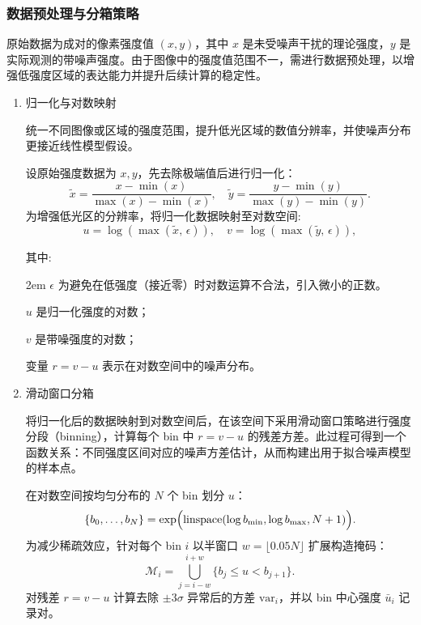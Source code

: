 \documentclass[a4paper]{article}
\begin{document}
	\subsubsection{数据预处理与分箱策略}
	原始数据为成对的像素强度值 $(x, y)$，其中 $x$ 是未受噪声干扰的理论强度，$y$ 是实际观测的带噪声强度。由于图像中的强度值范围不一，需进行数据预处理，以增强低强度区域的表达能力并提升后续计算的稳定性。
	\begin{enumerate}
    \item 归一化与对数映射\par
     \hspace{2em}统一不同图像或区域的强度范围，提升低光区域的数值分辨率，并使噪声分布更接近线性模型假设。\par
	设原始强度数据为 $x, y$，先去除极端值后进行归一化：
	$$
     \tilde x = \frac{x - \min(x)}{\max(x)-\min(x)},\quad
     \tilde y = \frac{y - \min(y)}{\max(y)-\min(y)}.
    $$
    为增强低光区的分辨率，将归一化数据映射至对数空间:
	$$
		u = \log(\max(\tilde x,\,\epsilon)),\quad
		v = \log(\max(\tilde y,\,\epsilon)),
	$$

	其中: \par
	
	\begin{adjustwidth}{2em}{} %
		$ \epsilon $ 为避免在低强度（接近零）时对数运算不合法，引入微小的正数。\par
		$ u $ 是归一化强度的对数；\par
		$ v $ 是带噪强度的对数；\par
		变量 $r = v - u$ 表示在对数空间中的噪声分布。
	\end{adjustwidth}
	\item 滑动窗口分箱\par
	\hspace{2em}将归一化后的数据映射到对数空间后，在该空间下采用滑动窗口策略进行强度分段（binning），计算每个 bin 中 $r = v - u$ 的残差方差。此过程可得到一个函数关系：不同强度区间对应的噪声方差估计，从而构建出用于拟合噪声模型的样本点。\par
	在对数空间按均匀分布的 $N$ 个 bin 划分 $u$：
	$$
		\{b_0,\dots,b_N\}=\exp\Bigl(\mathrm{linspace}(\log b_{\min},\log b_{\max},N+1)\Bigr).
	$$
	为减少稀疏效应，针对每个 bin $i$ 以半窗口 $w=\lfloor0.05N\rfloor$ 扩展构造掩码：
	$$
		\mathcal{M}_i = \bigcup_{j=i-w}^{i+w} \{b_j\le u<b_{j+1}\}.
	$$
	对残差 $r=v-u$ 计算去除 $\pm3\sigma$ 异常后的方差 $\mathrm{var}_i$，并以 bin 中心强度 $\bar u_i$ 记录对。





    \end{enumerate}
	
\end{document}
